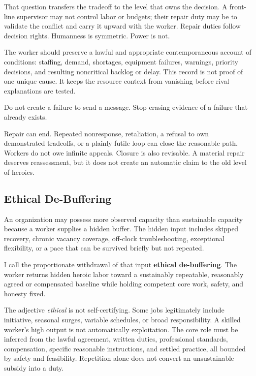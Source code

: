 \documentclass[12pt,oneside]{article}
\begin{document}
That question transfers the tradeoff to the level that owns the
decision. A front-line supervisor may not control labor or budgets;
their repair duty may be to validate the conflict and carry it upward
with the worker. Repair duties follow decision rights. Humanness is
symmetric. Power is not.

The worker should preserve a lawful and appropriate contemporaneous
account of conditions: staffing, demand, shortages, equipment failures,
warnings, priority decisions, and resulting noncritical backlog or
delay. This record is not proof of one unique cause. It keeps the
resource context from vanishing before rival explanations are tested.

Do not create a failure to send a message. Stop erasing evidence of a
failure that already exists.

Repair can end. Repeated nonresponse, retaliation, a refusal to own
demonstrated tradeoffs, or a plainly futile loop can close the
reasonable path. Workers do not owe infinite appeals. Closure is also
revisable. A material repair deserves reassessment, but it does not
create an automatic claim to the old level of heroics.

\hypertarget{ethical-de-buffering}{%
\subsection{Ethical De-Buffering}\label{ethical-de-buffering}}

An organization may possess more observed capacity than sustainable
capacity because a worker supplies a hidden buffer. The hidden input
includes skipped recovery, chronic vacancy coverage, off-clock
troubleshooting, exceptional flexibility, or a pace that can be survived
briefly but not repeated.

I call the proportionate withdrawal of that input \textbf{ethical
de-buffering}. The worker returns hidden heroic labor toward a
sustainably repeatable, reasonably agreed or compensated baseline while
holding competent core work, safety, and honesty fixed.

The adjective \emph{ethical} is not self-certifying. Some jobs
legitimately include initiative, seasonal surges, variable schedules, or
broad responsibility. A skilled worker's high output is not
automatically exploitation. The core role must be inferred from the
lawful agreement, written duties, professional standards, compensation,
specific reasonable instructions, and settled practice, all bounded by
safety and feasibility. Repetition alone does not convert an
unsustainable subsidy into a duty.
\end{document}
